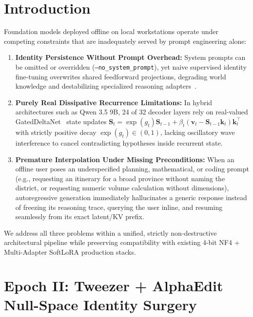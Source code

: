 \documentclass[11pt,a4paper]{article}
\begin{document}
\section{Introduction}

Foundation models deployed offline on local workstations operate under competing constraints that are inadequately served by prompt engineering alone:
\begin{enumerate}[leftmargin=1.5em]
    \item \textbf{Identity Persistence Without Prompt Overhead:} System prompts can be omitted or overridden (\texttt{--no\_system\_prompt}), yet naive supervised identity fine-tuning overwrites shared feedforward projections, degrading world knowledge and destabilizing specialized reasoning adapters~\cite{hu2021lora}.
    \item \textbf{Purely Real Dissipative Recurrence Limitations:} In hybrid architectures such as Qwen 3.5 9B, 24 of 32 decoder layers rely on real-valued GatedDeltaNet~\cite{yang2024gateddelta} state updates $\mathbf{S}_t = \exp(g_t)\mathbf{S}_{t-1} + \beta_t(\mathbf{v}_t - \mathbf{S}_{t-1}\mathbf{k}_t)\mathbf{k}_t^\top$ with strictly positive decay $\exp(g_t) \in (0,1)$, lacking oscillatory wave interference to cancel contradicting hypotheses inside recurrent state.
    \item \textbf{Premature Interpolation Under Missing Preconditions:} When an offline user poses an underspecified planning, mathematical, or coding prompt (e.g., requesting an itinerary for a broad province without naming the district, or requesting numeric volume calculation without dimensions), autoregressive generation immediately hallucinates a generic response instead of freezing its reasoning trace, querying the user inline, and resuming seamlessly from its exact latent/KV prefix.
\end{enumerate}

We address all three problems within a unified, strictly non-destructive architectural pipeline while preserving compatibility with existing 4-bit NF4 + Multi-Adapter SoftLoRA production stacks.

\section{Epoch II: Tweezer + AlphaEdit Null-Space Identity Surgery}
\end{document}
